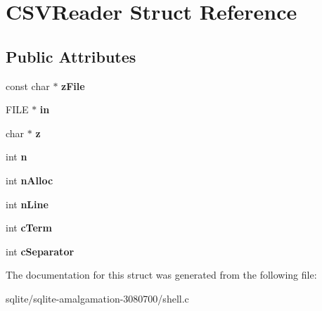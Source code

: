 \hypertarget{struct_c_s_v_reader}{\section{C\+S\+V\+Reader Struct Reference}
\label{struct_c_s_v_reader}
}
\subsection*{Public Attributes}
\begin{DoxyCompactItemize}
\item 
\hypertarget{struct_c_s_v_reader_ad04261cf16850ba239f90f1f17150d88}{const char $\ast$ {\bfseries z\+File}}\label{struct_c_s_v_reader_ad04261cf16850ba239f90f1f17150d88}

\item 
\hypertarget{struct_c_s_v_reader_a9900b182649fb695e00f206bcd50c198}{F\+I\+L\+E $\ast$ {\bfseries in}}\label{struct_c_s_v_reader_a9900b182649fb695e00f206bcd50c198}

\item 
\hypertarget{struct_c_s_v_reader_a29cd769928dd939d53ed69d9bad9c7dc}{char $\ast$ {\bfseries z}}\label{struct_c_s_v_reader_a29cd769928dd939d53ed69d9bad9c7dc}

\item 
\hypertarget{struct_c_s_v_reader_aff952cd6dea4a847a26ff1eacb4e1c65}{int {\bfseries n}}\label{struct_c_s_v_reader_aff952cd6dea4a847a26ff1eacb4e1c65}

\item 
\hypertarget{struct_c_s_v_reader_adbe5aad57a1380dd670d31a1eb0b5c15}{int {\bfseries n\+Alloc}}\label{struct_c_s_v_reader_adbe5aad57a1380dd670d31a1eb0b5c15}

\item 
\hypertarget{struct_c_s_v_reader_ad3ae7c994d7bbb901303471d7438ce66}{int {\bfseries n\+Line}}\label{struct_c_s_v_reader_ad3ae7c994d7bbb901303471d7438ce66}

\item 
\hypertarget{struct_c_s_v_reader_aa726165e3f9f62309e7eb114fa51bdff}{int {\bfseries c\+Term}}\label{struct_c_s_v_reader_aa726165e3f9f62309e7eb114fa51bdff}

\item 
\hypertarget{struct_c_s_v_reader_aac8eb308c6e37208d23bdbad11c31d32}{int {\bfseries c\+Separator}}\label{struct_c_s_v_reader_aac8eb308c6e37208d23bdbad11c31d32}

\end{DoxyCompactItemize}


The documentation for this struct was generated from the following file\+:\begin{DoxyCompactItemize}
\item 
sqlite/sqlite-\/amalgamation-\/3080700/shell.\+c\end{DoxyCompactItemize}
